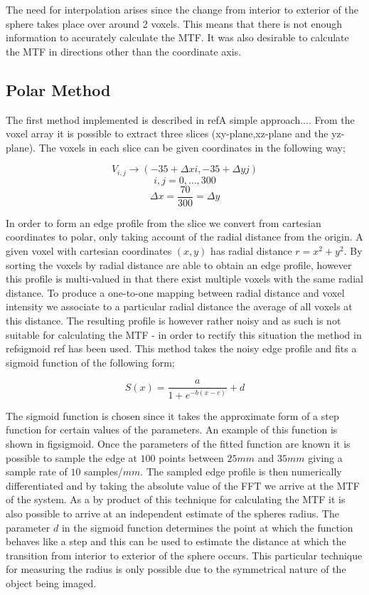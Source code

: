 \documentclass[
  twoside,
  11pt, a4paper,
  footinclude=true,
  headinclude=true,
  cleardoublepage=empty
]{scrbook}
\begin{document}
The need for interpolation arises since the change from interior to exterior of the sphere takes place over around 2 voxels. This means that there is not enough information to accurately calculate the MTF. It was also desirable to calculate the MTF in directions other than the coordinate axis.

\subsection{Polar Method}
The first method implemented is described in ref{A simple approach...}. From the voxel array it is possible to extract three slices (xy-plane,xz-plane and the yz-plane). The voxels in each slice can be given coordinates in the following way;

\[
V_{i,j} \rightarrow (-35+\Delta x i,-35+\Delta y j)
\]
\[
i,j = 0,\dots,300
\]
\[
\Delta x = \frac{70}{300} = \Delta y
\]

In order to form an edge profile from the slice we convert from cartesian coordinates to polar, only taking account of the radial distance from the origin. A given voxel with cartesian coordinates $(x,y)$ has radial distance $r = x^2 + y^2$. By sorting the voxels by radial distance are able to obtain an edge profile, however this profile is multi-valued in that there exist multiple voxels with the same radial distance. To produce a one-to-one mapping between radial distance and voxel intensity we associate to a particular radial distance the average of all voxels at this distance. The resulting profile is however rather noisy and as such is not suitable for calculating the MTF - in order to rectify this situation the method in ref{sigmoid ref} has been used. This method takes the noisy edge profile and fits a sigmoid function of the following form;

\[
S(x) = \frac{a}{1+e^{-b(x-c)}} + d
\]

The sigmoid function is chosen since it takes the approximate form of a step function for certain values of the parameters. An example of this function is shown in fig{sigmoid}. Once the parameters of the fitted function are known it is possible to sample the edge at $100$ points between $25mm$ and $35mm$ giving a sample rate of $10$ samples/$mm$. The sampled edge profile is then numerically differentiated and by taking the absolute value of the FFT we arrive at the MTF of the system. As a by product of this technique for calculating the MTF it is also possible to arrive at an independent estimate of the spheres radius. The parameter $d$ in the sigmoid function determines the point at which the function behaves like a step and this can be used to estimate the distance at which the transition from interior to exterior of the sphere occurs. This particular technique for measuring the radius is only possible due to the symmetrical nature of the object being imaged.
\end{document}
